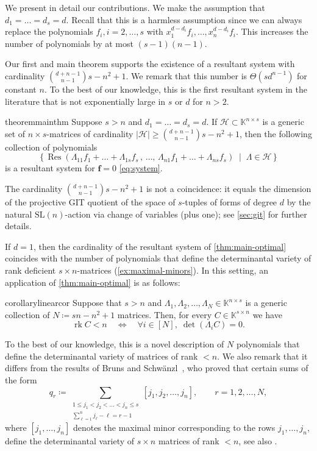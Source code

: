 \documentclass[11pt,a4paper]{article}
\numberwithin{equation}{section}
\newcommand{\KK}{\mathbb{K}}
\newcommand{\cH}{\mathcal{H}}
\newcommand{\ff}{\ensuremath{\boldsymbol{f}}}
\newcommand{\SL}{\mathrm{SL}}
\DeclareMathOperator{\rk}{rk}
\DeclareMathOperator{\Res}{Res}
\begin{document}
We present in detail our contributions. 
We make the assumption that $d_1=\dots=d_s=d$.
Recall that this is a harmless assumption since we can always replace the polynomials $f_i, i=2,\dots,s$ with $x_1^{d-d_i}f_i,\dots,x_n^{d-d_i}f_i$.
This increases the number of polynomials by at most $(s-1)(n-1)$.


Our first and  main theorem  supports the existence of a resultant system with cardinality $\binom{d+n-1}{n-1}s-n^2+1$. 
We remark that this number is $\Theta(s d^{n-1})$ for constant $n$.
To the best of our knowledge, this is the first resultant system in the literature that is not exponentially large in $s$ or $d$ for $n>2$.
\begin{restatable}{theorem}{mainthm}
\label{thm:main-optimal}
	Suppose $s>n$ and $d_1=\dots=d_s=d$.
	If $\cH\subset\KK^{n\times s}$ is a generic set of $n\times s$-matrices of cardinality $|\cH|\geq \binom{d+n-1}{n-1}s-n^2+1$, then the following collection of polynomials 
	\begin{equation}
    \label{eq:resultant-system}
	\big\{\,\Res(\Lambda_{11}f_1+\dots+\Lambda_{1s}f_s\,,\, \dots,\, \Lambda_{n1}f_1+\dots+\Lambda_{ns}f_s)\;\mid\; \Lambda\in\cH\,\big\}
	\end{equation}  
	is a resultant system for $\ff = 0$ \eqref{eq:system}.
\end{restatable}

The cardinality $\binom{d+n-1}{n-1}s-n^2+1$ is not a coincidence:
it equals the dimension of the projective GIT quotient of the space of $s$-tuples of forms of degree $d$ by the natural $\SL(n)$-action via change of variables (plus one); 
see \cref{sec:git} for further details.

If $d=1$, then the cardinality of the resultant system 
of \cref{thm:main-optimal} coincides with the number of polynomials that define the determinantal variety of rank deficient $s\times n$-matrices (\cref{ex:maximal-minors}).
In this setting, an application of \cref{thm:main-optimal} is as follows:
\begin{restatable}{corollary}{linearcor}
\label{cor:linear-resultant-system}
    Suppose that $s>n$ and $\Lambda_1,\Lambda_2,\dots,\Lambda_{N}\in\KK^{n\times s}$ is a generic collection of $N\coloneqq sn-n^2+1$ matrices.
    Then, for every $C\in\KK^{s\times n}$ we have \[
    \rk C < n \quad\iff\quad \forall i\in [N], \; \det(\Lambda_i C)=0.
    \]
\end{restatable}
To the best of our knowledge, this is a novel description of $N$ polynomials that define the determinantal variety of matrices of rank $<n$.
We also remark that it differs from the results of Bruns and Schw{\"{a}}nzl~\cite{Bruns-Schwanzl-90},
who proved that certain sums of the form \[
q_r \coloneqq \sum_{\substack{1\leq j_1 < j_2 < \dots < j_n \leq s\\ \sum_{\ell=1}^n j_\ell-\ell=r-1}} [j_1, j_2,\dots, j_n],\qquad r=1,2,\dots,N,
\] where $[j_1,\dots,j_n]$ denotes the maximal minor corresponding to the rows $j_1,\dots,j_n$, define the determinantal variety of $s\times n$ matrices of rank $<n$, see also \cite{Nie-10}.
\end{document}
